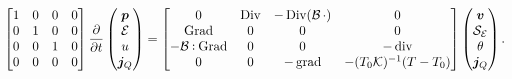 \documentclass[11t]{article}
\DeclareMathOperator*{\grad}{grad}
\DeclareMathOperator*{\Grad}{Grad}
\DeclareMathOperator*{\Div}{Div}
\renewcommand{\div}{\operatorname{div}}
\def\onedot{$\mathsurround0pt\ldotp$}
\def\cddot{%
	\mathbin{\vcenter{\baselineskip.67ex
			\hbox{\onedot}\hbox{\onedot}}%
}}
\begin{document}
\begin{equation}
\begin{bmatrix}
1 & 0 & 0 & 0\\
0 & 1 & 0 & 0\\
0 & 0 & 1 & 0\\
0 & 0 & 0 & 0\\
\end{bmatrix}
\diffp{}{t}
\begin{pmatrix}
\bm{p} \\
\mathcal{E} \\
u \\
\bm{j}_Q \\
\end{pmatrix} = 
\begin{bmatrix}
0 & \Div & - \Div(\mathcal{B} \, \cdot) & 0\\
\Grad & 0 & 0 & 0 \\
- \mathcal{B} \cddot  \Grad & 0 & 0 & -\div \\
0 & 0 & -\grad & - (T_0 \mathcal{K})^{-1}(T - T_0) \\
\end{bmatrix}
\begin{pmatrix}
\bm{v} \\
\mathcal{S_E} \\
\theta \\
\bm{j}_Q \\
\end{pmatrix}.
\end{equation}
\end{document}
